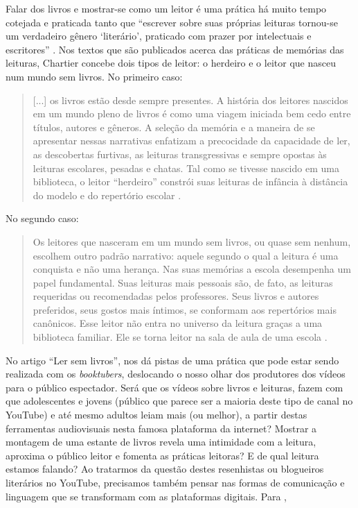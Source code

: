 Falar dos livros e mostrar-se como um leitor é uma prática há muito tempo cotejada e praticada tanto que  “escrever sobre suas próprias leituras tornou-se um verdadeiro gênero ‘literário’, praticado com prazer por intelectuais e escritores” \cite[p. 7]{chartier2019lersem}. Nos textos que são publicados acerca das práticas de memórias das leituras, Chartier concebe dois tipos de leitor: o herdeiro e o leitor que nasceu num mundo sem livros. No primeiro caso:

\begin{quote}
[...] os livros estão desde sempre presentes. A história dos leitores nascidos em um mundo pleno de livros é como uma viagem iniciada bem cedo entre títulos, autores e gêneros. A seleção da memória e a maneira de se apresentar nessas narrativas enfatizam a precocidade da capacidade de ler, as descobertas furtivas, as leituras transgressivas e sempre opostas às leituras escolares, pesadas e chatas. Tal como se tivesse nascido em uma biblioteca, o leitor “herdeiro” constrói suas leituras de infância à distância do modelo e do repertório escolar \cite[p. 7–8]{chartier2019lersem}.
\end{quote}

No segundo caso:

\begin{quote}
Os leitores que nasceram em um mundo sem livros, ou quase sem nenhum, escolhem outro padrão narrativo: aquele segundo o qual a leitura é uma conquista e não uma herança. Nas suas memórias a escola desempenha um papel fundamental. Suas leituras mais pessoais são, de fato, as leituras requeridas ou recomendadas pelos professores. Seus livros e autores preferidos, seus gostos mais íntimos, se conformam aos repertórios mais canônicos. Esse leitor não entra no universo da leitura graças a uma biblioteca familiar. Ele se torna leitor na sala de aula de uma escola \cite[p. 8]{chartier2019lersem}.
\end{quote}

No artigo “Ler sem livros”, \textcite{chartier2019lersem} nos dá pistas de uma prática que pode estar sendo realizada com os \textit{booktubers}, deslocando o nosso olhar dos produtores dos vídeos para o público espectador. Será que os vídeos sobre livros e leituras, fazem com que adolescentes e jovens (público que parece ser a maioria deste tipo de canal no YouTube) e até mesmo adultos leiam mais (ou melhor), a partir destas ferramentas audiovisuais nesta famosa plataforma da internet? Mostrar a montagem de uma estante de livros revela uma intimidade com a leitura, aproxima o público leitor e fomenta as práticas leitoras? E de qual leitura estamos falando? Ao tratarmos da questão destes resenhistas ou blogueiros literários no YouTube, precisamos também pensar nas formas de comunicação e linguagem que se transformam com as plataformas digitais. Para \textcite{chartier2019lersem},

